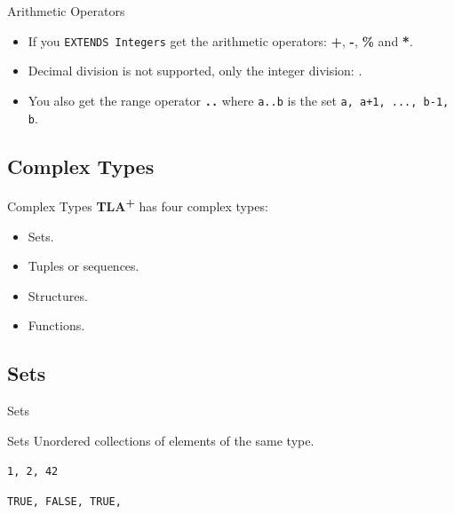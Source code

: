\documentclass[10pt]{beamer}
\newcommand{\tlaplus}{\textbf{\textsc{TLA\textsuperscript{+}}}\xspace}
\begin{document}
\begin{frame}{Arithmetic Operators}
  \begin{itemize}
    \item  If you \texttt{EXTENDS Integers} get the arithmetic operators: \textbf{+}, \textbf{-}, \textbf{\%} and \textbf{*}.
    \item  Decimal division is not supported, only the integer division: \textbf{\texttt{\div}}.
    \item You also get the range operator \textbf{\texttt{..}} where \texttt{a..b} is the set \texttt{{a, a+1, ..., b-1, b}}.
  \end{itemize}
\end{frame}

\subsection{Complex Types}

\begin{frame}{Complex Types}
  \tlaplus has four complex types:
  \begin{itemize}
    \item Sets.
    \item Tuples or sequences.
    \item Structures.
    \item Functions.
  \end{itemize}
\end{frame}

\subsection{Sets}

\begin{frame}{Sets}
  \begin{exampleblock}{Sets}
    \alert{Unordered} collections of elements of the \alert{same type}.
  \end{exampleblock}

  \texttt{{1, 2, 42}}

  \texttt{{{TRUE}, {FALSE, TRUE}, {}}}  
\end{frame}
\end{document}

